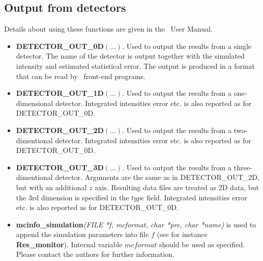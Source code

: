 \subsection{Output from detectors}
Details about using these functions are given in the \MCS\ User Manual.
\begin{itemize}
\item {\bf DETECTOR\_OUT\_0D}$(...)$. Used to output the results from a
  single detector. The name of the detector is output together
  with the simulated intensity and estimated statistical error. The
  output is produced in a format that can be read by \MCS\ front-end
  programs.
\item {\bf DETECTOR\_OUT\_1D}$(...)$. Used to output the results from a
  one-dimensional detector. Integrated intensities error etc. is also
  reported as for DETECTOR\_OUT\_0D.
\item {\bf DETECTOR\_OUT\_2D}$(...)$. Used to output the results from a
  two-dimentional detector. Integrated intensities error etc. is also
  reported as for DETECTOR\_OUT\_0D.
\item {\bf DETECTOR\_OUT\_3D}$(...)$. Used to output
  the results from a three-dimentional detector. Arguments are the same as
  in DETECTOR\_OUT\_2D, but with an additional $z$ axis.
  Resulting data files are treated as 2D data, but the 3rd dimension is
  specified in the $type$ field. Integrated intensities error etc. is also
  reported as for DETECTOR\_OUT\_0D.
\item {\bf mcinfo\_simulation}{\it (FILE *f, mcformat,
  char *pre, char *name)} is used to append the simulation parameters into file $f$
  (see for instance {\bf Res\_monitor}).
  Internal variable $mcformat$ should be used as specified.
  Please contact the authors for further information.
\end{itemize}

